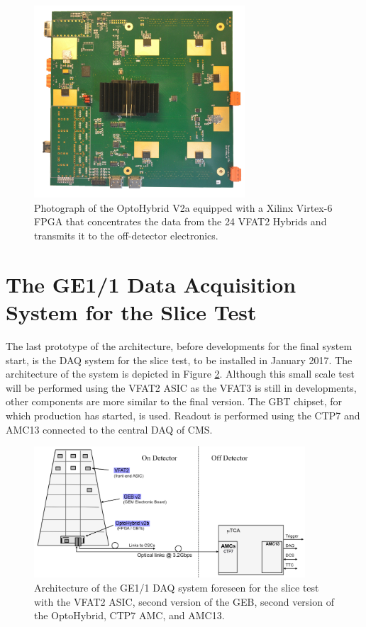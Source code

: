       \begin{figure}[t!]
        \centering
        \includegraphics[width=0.7\textwidth]{img/II-2-daq/oh-v2a.jpg}
        \caption{Photograph of the OptoHybrid V2a equipped with a Xilinx Virtex-6 FPGA that concentrates the data from the 24 VFAT2 Hybrids and transmits it to the off-detector electronics.}
        \label{fig:II-2-ohv2a}
      \end{figure}

  \section{The GE1/1 Data Acquisition System for the Slice Test}

    The last prototype of the architecture, before developments for the final system start, is the DAQ system for the slice test, to be installed in January 2017. The architecture of the system is depicted in Figure \ref{fig:II-2-gem-system-v2b}. Although this small scale test will be performed using the VFAT2 ASIC as the VFAT3 is still in developments, other components are more similar to the final version. The GBT chipset, for which production has started, is used. Readout is performed using the CTP7 and AMC13 connected to the central DAQ of CMS.

    \begin{figure}[b!]
      \centering
      \includegraphics[width=0.9\textwidth]{img/II-2-daq/gem-system-v2b.pdf}
      \caption{Architecture of the GE1/1 DAQ system foreseen for the slice test with the VFAT2 ASIC, second version of the GEB, second version of the OptoHybrid, CTP7 AMC, and AMC13.}
      \label{fig:II-2-gem-system-v2b}
    \end{figure}


